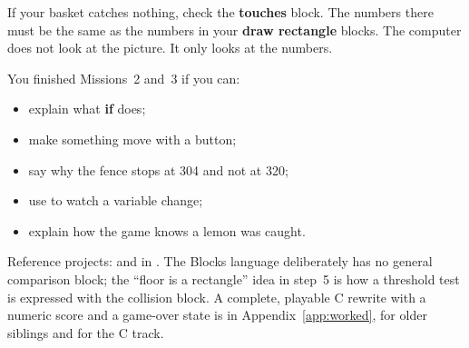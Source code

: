 \begin{prgwarn}
If your basket catches nothing, check the \textbf{touches} block. The numbers
there must be the same as the numbers in your \textbf{draw rectangle} blocks.
The computer does not look at the picture. It only looks at the numbers.
\end{prgwarn}

\begin{prgcheck}
You finished Missions~2 and~3 if you can:
\begin{itemize}
  \item explain what \textbf{if} does;
  \item make something move with a button;
  \item say why the fence stops at 304 and not at 320;
  \item use  to watch a variable change;
  \item explain how the game knows a lemon was caught.
\end{itemize}
\end{prgcheck}

\begin{prggrownup}
Reference projects:  and
 in .
The Blocks language deliberately has no general comparison block; the ``floor
is a rectangle'' idea in step~5 is how a threshold test is expressed with the
collision block. A complete, playable C rewrite with a numeric score and a
game-over state is in Appendix~\ref{app:worked}, for older siblings and for the
C track.
\end{prggrownup}
